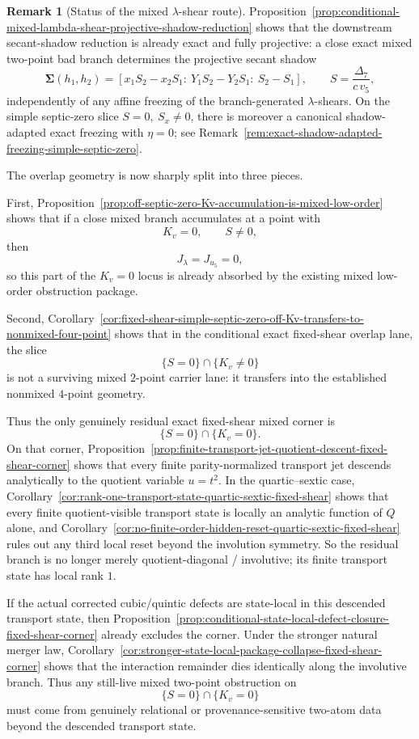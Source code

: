 \documentclass[11pt,a4paper]{amsart}
\theoremstyle{plain}
\theoremstyle{definition}
\newtheorem{remark}[theorem]{Remark}
\begin{document}
\begin{remark}[Status of the mixed $\lambda$-shear route]
\label{rem:wip-mixed-lambda-shear-route-status}
Proposition~\ref{prop:conditional-mixed-lambda-shear-projective-shadow-reduction}
shows that the downstream secant-shadow reduction is already exact and fully
projective: a close exact mixed two-point bad branch determines the projective
secant shadow
\[
\mathbf\Sigma(h_1,h_2)
=
[x_1S_2-x_2S_1:\ Y_1S_2-Y_2S_1:\ S_2-S_1],
\qquad
S=\frac{\Delta_7}{c\,v_5},
\]
independently of any affine freezing of the branch-generated $\lambda$-shears.
On the simple septic-zero slice $S=0,\ S_x\neq 0$, there is moreover a
canonical shadow-adapted exact freezing with $\eta=0$; see
Remark~\ref{rem:exact-shadow-adapted-freezing-simple-septic-zero}.

The overlap geometry is now sharply split into three pieces.

First,
Proposition~\ref{prop:off-septic-zero-Kv-accumulation-is-mixed-low-order}
shows that if a close mixed branch accumulates at a point with
\[
K_v=0,
\qquad
S\neq 0,
\]
then
\[
J_\lambda=J_{u_5}=0,
\]
so this part of the $K_v=0$ locus is already absorbed by the existing mixed
low-order obstruction package.

Second,
Corollary~\ref{cor:fixed-shear-simple-septic-zero-off-Kv-transfers-to-nonmixed-four-point}
shows that in the conditional exact fixed-shear overlap lane, the slice
\[
\{S=0\}\cap\{K_v\neq 0\}
\]
is not a surviving mixed $2$-point carrier lane: it transfers into the
established nonmixed $4$-point geometry.

Thus the only genuinely residual exact fixed-shear mixed corner is
\[
\{S=0\}\cap\{K_v=0\}.
\]
On that corner,
Proposition~\ref{prop:finite-transport-jet-quotient-descent-fixed-shear-corner}
shows that every finite parity-normalized transport jet descends analytically to
the quotient variable $u=t^2$. In the quartic--sextic case,
Corollary~\ref{cor:rank-one-transport-state-quartic-sextic-fixed-shear} shows
that every finite quotient-visible transport state is locally an analytic
function of $Q$ alone, and
Corollary~\ref{cor:no-finite-order-hidden-reset-quartic-sextic-fixed-shear}
rules out any third local reset beyond the involution symmetry. So the residual
branch is no longer merely quotient-diagonal / involutive; its finite
transport state has local rank $1$.

If the actual corrected cubic/quintic defects are state-local in this descended
transport state, then
Proposition~\ref{prop:conditional-state-local-defect-closure-fixed-shear-corner}
already excludes the corner. Under the stronger natural merger law,
Corollary~\ref{cor:stronger-state-local-package-collapse-fixed-shear-corner}
shows that the interaction remainder dies identically along the involutive
branch. Thus any still-live mixed two-point obstruction on
\[
\{S=0\}\cap\{K_v=0\}
\]
must come from genuinely relational or provenance-sensitive two-atom data
beyond the descended transport state.
\end{remark}
\end{document}
